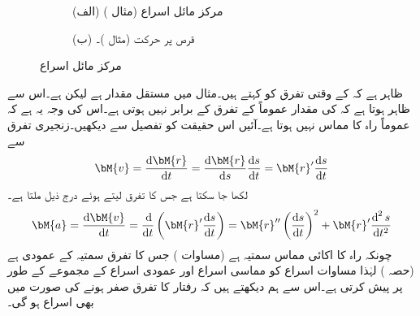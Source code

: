 \begin{figure}
\centering
\begin{subfigure}{0.5\textwidth}
\centering
{}
\caption*{(الف) مرکز مائل اسراع (مثال )}
\end{subfigure}%
\begin{subfigure}{0.5\textwidth}
\centering
{}
\caption*{(ب) قرص پر حرکت (مثال )۔}
\end{subfigure}%
\caption{مرکز مائل اسراع}
\label{شکل_مثال_الاحصاء_مرکز_مائل_اسراع}
\end{figure}


ظاہر ہے کہ  کے وقتی تفرق کو  کہتے ہیں۔مثال  میں  مستقل مقدار ہے  لیکن  ہے۔اس سے ظاہر ہوتا ہے کہ  کی مقدار عموماً   کے تفرق کے برابر نہیں ہوتی ہے۔اس کی وجہ یہ ہے کہ  عموماً راہ  کا مماس نہیں ہوتا ہے۔آئیں اس حقیقت کو تفصیل سے دیکھیں۔زنجیری تفرق سے 
\begin{align*}
\bM{v}=\frac{\dif \bM{r}}{\dif t}=\frac{\dif \bM{r}}{\dif s}\frac{\dif s}{\dif t}=\bM{r}'\frac{\dif s}{\dif t}
\end{align*}
لکھا جا سکتا ہے جس کا تفرق لیتے ہوئے درج ذیل ملتا ہے۔
\begin{align}\label{مساوات_الاحصاء_اجزاء_اسراع}
\bM{a}=\frac{\dif \bM{v}}{\dif t}=\frac{\dif}{\dif t}\left(\bM{r}'\frac{\dif s}{\dif t}\right)=\bM{r}''\left(\frac{\dif s}{\dif t}\right)^2+\bM{r}'\frac{\dif^{\,2} s}{\dif t^2}
\end{align}
چونکہ  راہ  کا اکائی مماس سمتیہ  ہے (مساوات ) جس کا تفرق  سمتیہ   کے عمودی ہے (حصہ ) لہٰذا مساوات  اسراع کو مماسی اسراع  اور عمودی اسراع  کے مجموعے کے طور پر پیش کرتی ہے۔اس سے ہم دیکھتے ہیں کہ رفتار کا تفرق صفر ہونے کی صورت  میں بھی اسراع ہو گی۔

